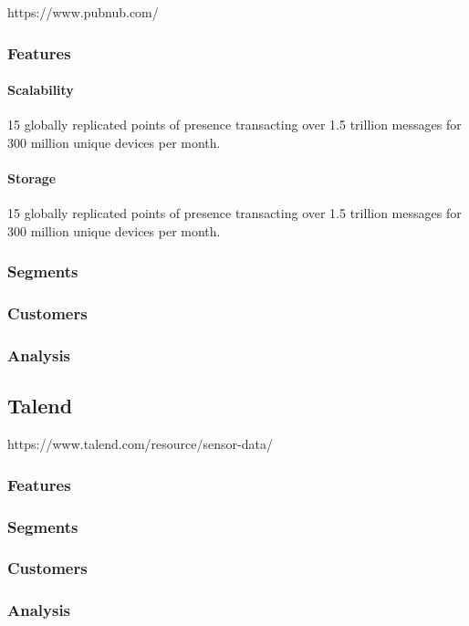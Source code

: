 https://www.pubnub.com/

\subsubsection{Features}\label{features-1}

\paragraph{Scalability}\label{scalability}

15 globally replicated points of presence transacting over 1.5 trillion
messages for 300 million unique devices per month.

\paragraph{Storage}\label{storage}

15 globally replicated points of presence transacting over 1.5 trillion
messages for 300 million unique devices per month.

\subsubsection{Segments}\label{segments-1}

\subsubsection{Customers}\label{customers-1}

\subsubsection{Analysis}\label{analysis-1}

\subsection{Talend}\label{talend}

https://www.talend.com/resource/sensor-data/


\subsubsection{Features}\label{features-2}

\subsubsection{Segments}\label{segments-2}

\subsubsection{Customers}\label{customers-2}

\subsubsection{Analysis}\label{analysis-2}
